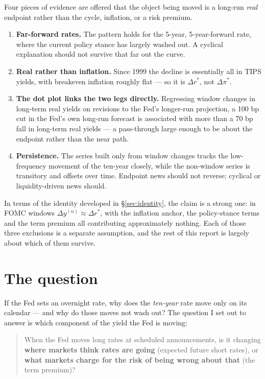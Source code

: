 \documentclass[11pt]{article}
\begin{document}
\noindent Four pieces of evidence are offered that the object being moved is a long-run
\emph{real} endpoint rather than the cycle, inflation, or a risk premium.

\begin{enumerate}\setlength\itemsep{0.2em}
\item \textbf{Far-forward rates.} The pattern holds for the 5-year, 5-year-forward rate, where
the current policy stance has largely washed out. A cyclical explanation should not survive
that far out the curve.
\item \textbf{Real rather than inflation.} Since 1999 the decline is essentially all in TIPS
yields, with breakeven inflation roughly flat --- so it is $\Delta r^{*}$, not $\Delta\pi^{*}$.
\item \textbf{The dot plot links the two legs directly.} Regressing window changes in
long-term real yields on revisions to the Fed's longer-run projection, a 100 bp cut in the
Fed's own long-run forecast is associated with more than a 70 bp fall in long-term real
yields --- a pass-through large enough to be about the endpoint rather than the near path.
\item \textbf{Persistence.} The series built only from window changes tracks the low-frequency
movement of the ten-year closely, while the non-window series is transitory and offsets over
time. Endpoint news should not reverse; cyclical or liquidity-driven news should.
\end{enumerate}

\noindent In terms of the identity developed in \S\ref{sec:identity}, the claim is a strong
one: in FOMC windows $\Delta y^{(n)} \approx \Delta r^{*}$, with the inflation anchor, the
policy-stance terms and the term premium all contributing approximately nothing. Each of
those three exclusions is a separate assumption, and the rest of this report is largely about
which of them survive.

\section{The question}

If the Fed sets an overnight rate, why does the \emph{ten-year} rate move only on its
calendar --- and why do those moves not wash out? The question I set out to answer is which
component of the yield the Fed is moving:

\begin{quote}
When the Fed moves long rates at scheduled announcements, is it changing \textbf{where markets
think rates are going} (expected future short rates), or \textbf{what markets charge for the risk
of being wrong about that} (the term premium)?
\end{quote}
\end{document}

